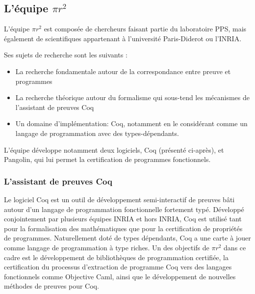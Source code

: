 \documentclass[a4paper, 11pt]{report}
\newcommand{\pir}[0]{\textbf{$\pi r^2$}\xspace}
\begin{document}
      \subsection{L'équipe \pir}
      L'équipe \pir{} est composée de chercheurs faisant partie du laboratoire
      PPS, mais également de scientifiques appartenant à l'université
      Paris-Diderot ou l'INRIA.

      Ses sujets de recherche sont les suivants :
      \begin{itemize}
        \item La recherche fondamentale autour de la correspondance entre preuve et programmes
        \item La recherche théorique autour du formalisme qui sous-tend les
          mécanismes de l'assistant de preuves Coq
        \item Un domaine d'implémentation: Coq, notamment en le considérant comme
          un langage de programmation avec des types-dépendants.
      \end{itemize}
      L'équipe développe notamment deux logiciels, Coq (présenté ci-après),
      et Pangolin, qui lui permet la certification de programmes fonctionnels.
      \subsubsection{L'assistant de preuves Coq}
      Le logiciel Coq est un outil de développement semi-interactif de
      preuves bâti autour d'un langage de programmation fonctionnelle
      fortement typé. Développé conjointement par plusieurs équipes INRIA et
      hors INRIA, Coq est utilisé tant pour la formalisation des
      mathématiques que pour la certification de propriétés de programmes.
      Naturellement doté de types dépendants, Coq a une carte à jouer comme
      langage de programmation à type riches. Un des objectifs de \pir dans
      ce cadre est le développement de bibliothèques de programmation
      certifiée, la certification du processus d'extraction de programme Coq
      vers des langages fonctionnels comme Objective Caml, ainsi que le
      développement de nouvelles méthodes de preuves pour Coq.
\end{document}
